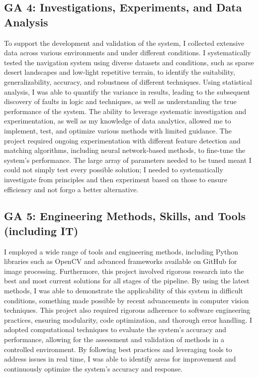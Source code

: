 \subsection*{GA 4: Investigations, Experiments, and Data Analysis}
To support the development and validation of the system, I collected extensive data across various environments and under different conditions. I systematically tested the navigation system using diverse datasets and conditions, such as sparse desert landscapes and low-light repetitive terrain, to identify the suitability, generalizability, accuracy, and robustness of different techniques. Using statistical analysis, I was able to quantify the variance in results, leading to the subsequent discovery of faults in logic and techniques, as well as understanding the true performance of the system. The ability to leverage systematic investigation and experimentation, as well as my knowledge of data analytics, allowed me to implement, test, and optimize various methods with limited guidance. The project required ongoing experimentation with different feature detection and matching algorithms, including neural network-based methods, to fine-tune the system's performance. The large array of parameters needed to be tuned meant I could not simply test every possible solution; I needed to systematically investigate from principles and then experiment based on those to ensure efficiency and not forgo a better alternative.

\subsection*{GA 5: Engineering Methods, Skills, and Tools (including IT)}
I employed a wide range of tools and engineering methods, including Python libraries such as OpenCV and advanced frameworks available on GitHub for image processing. Furthermore, this project involved rigorous research into the best and most current solutions for all stages of the pipeline. By using the latest methods, I was able to demonstrate the applicability of this system in difficult conditions, something made possible by recent advancements in computer vision techniques. This project also required rigorous adherence to software engineering practices, ensuring modularity, code optimization, and thorough error handling. I adopted computational techniques to evaluate the system's accuracy and performance, allowing for the assessment and validation of methods in a controlled environment. By following best practices and leveraging tools to address issues in real time, I was able to identify areas for improvement and continuously optimize the system’s accuracy and response.

